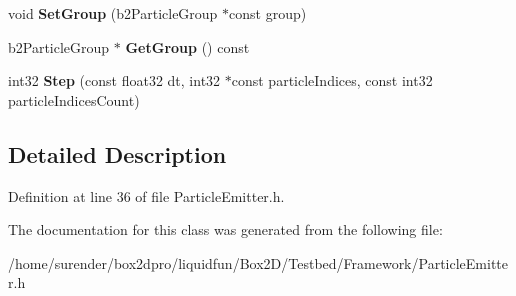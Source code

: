 \begin{DoxyCompactItemize}
\item 
\hypertarget{classRadialEmitter_acbb9e0c18921b08cd37ed17e569aae57}{void {\bfseries Set\-Group} (b2\-Particle\-Group $\ast$const group)}\label{classRadialEmitter_acbb9e0c18921b08cd37ed17e569aae57}

\item 
\hypertarget{classRadialEmitter_a089212502b68ff0d67c0a1e5fc2167e9}{b2\-Particle\-Group $\ast$ {\bfseries Get\-Group} () const }\label{classRadialEmitter_a089212502b68ff0d67c0a1e5fc2167e9}

\item 
\hypertarget{classRadialEmitter_a66bf43ec3f1454127cf2a02de08f523c}{int32 {\bfseries Step} (const float32 dt, int32 $\ast$const particle\-Indices, const int32 particle\-Indices\-Count)}\label{classRadialEmitter_a66bf43ec3f1454127cf2a02de08f523c}

\end{DoxyCompactItemize}


\subsection{Detailed Description}


Definition at line 36 of file Particle\-Emitter.\-h.



The documentation for this class was generated from the following file\-:\begin{DoxyCompactItemize}
\item 
/home/surender/box2dpro/liquidfun/\-Box2\-D/\-Testbed/\-Framework/Particle\-Emitter.\-h\end{DoxyCompactItemize}
